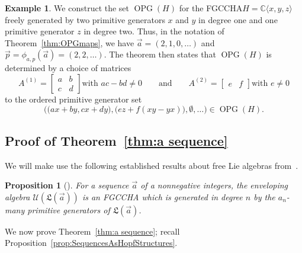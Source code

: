 \documentclass[11pt]{amsart}
\newtheorem{proposition}[theorem]{Proposition}
\theoremstyle{definition}
\newtheorem{example}[theorem]{Example}
\numberwithin{equation}{section}
\def\CC{{\mathbb C}}
\newcommand{\FGCCHA}{\textsf{FGCCHA}\xspace}
\newcommand{\OPG}{\operatorname{OPG}}
\begin{document}
\begin{example}
\label{ex:OPG}
We construct the set $\OPG(H)$ for the \FGCCHA $H = \CC\langle x, y, z\rangle$ freely generated by two primitive generators $x$ and $y$ in degree one and one primitive generator $z$ in degree two.  
Thus, in the notation of Theorem~\ref{thm:OPGmaps}, we have $\vec{a} = (2, 1, 0, \ldots)$ and $\vec{p} = \phi_{a, p}(\vec{a}) = (2, 2, \ldots)$. 
The theorem then states that $\OPG(H)$ is determined by a choice of matrices
\[
A^{(1)} = \begin{bmatrix}
a & b \\
c & d
\end{bmatrix}
\text{with $ac-bd \neq 0$}
\qquad\text{and}\qquad
A^{(2)} = \begin{bmatrix}
e & f
\end{bmatrix}
\text{with $e \neq 0$}
\]
to the ordered primitive generator set
\[
\Big(\big(ax+by, cx+dy\big), \big(ez + f(xy-yx)\big), \emptyset, \ldots \Big) \in \OPG(H).
\]
\end{example}

\subsection{Proof of Theorem~\ref{thm:a sequence}}
\label{sec:classificationproof}

We will make use the following established results
about free Lie algebras from~\cite{Reutenauer-FreeLieAlgebras}.

\begin{proposition}[{\cite[Theorem 0.5]{Reutenauer-FreeLieAlgebras}}]
\label{prop:LieToFree}
For a sequence $\vec{a}$ of a nonnegative integers, the enveloping algebra $\mathcal{U}(\mathfrak{L}(\vec{a}))$ is an \FGCCHA which is generated in degree $n$ by the $a_{n}$-many primitive generators of $\mathfrak{L}(\vec{a})$.
\end{proposition}

We now prove Theorem~\ref{thm:a sequence}; recall Proposition~\ref{prop:SequencesAsHopfStructures}.
\end{document}
